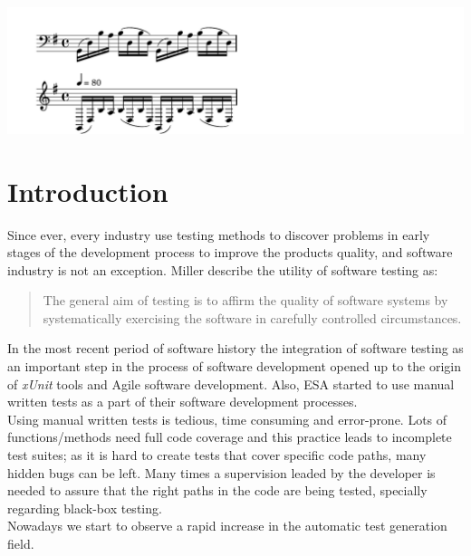 \begin{savequote}[10pc]
{%
\parindent 0pt
\ifx\preLilyPondExample \undefined
\else
  \expandafter\preLilyPondExample
\fi
\def\lilypondbook{}%
\includegraphics[width=3.5\textwidth]{images/bachPrelude}
\ifx\postLilyPondExample \undefined
\else
  \expandafter\postLilyPondExample
\fi
}
\end{savequote}
\chapter{Introduction}
\minitoc

Since ever, every industry use testing methods to discover problems in early stages of the development process to improve
the products quality, and software industry is not an exception. Miller\cite{miller} describe the utility
of software testing as:

\begin{quotation}
The general aim of testing is to affirm the quality of software systems by systematically
exercising the software in carefully controlled circumstances.
\end{quotation}

In the most recent period of software history the integration of
software testing as an important step in the process of
software development opened up to the origin of \textit{xUnit}\cite{xunit}
tools and Agile software development.
Also, \ac{ESA} started to use manual written tests as a part of their
software development processes.\\
Using  manual written tests is tedious, time consuming and error-prone.
Lots of functions/methods need full code coverage and this practice
leads to incomplete test suites;
as it is hard to create tests that cover specific code paths, many
hidden bugs can be left.
Many times a supervision leaded by the developer
is needed to assure that the right paths in the code are being tested,
specially regarding black-box testing.\\
Nowadays we start to observe a rapid increase in the automatic test
generation field.

